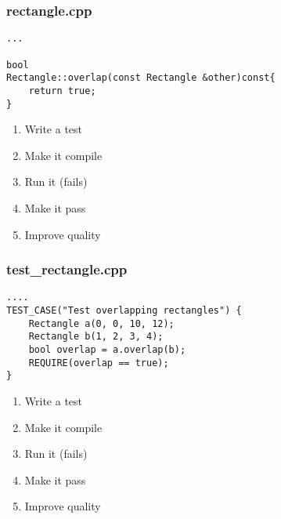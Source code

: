 \begin{frame}[fragile]
\frametitle{rectangle.cpp}
\begin{minipage}[t]{0.48\linewidth}
\begin{lstlisting}
...

bool 
Rectangle::overlap(const Rectangle &other)const{
    return true;
}
\end{lstlisting}
\end{minipage}\hfill
\begin{minipage}[t]{0.28\linewidth}
  \small
  \begin{enumerate} 
    \item \textcolor{deadcolor}{Write a test}
    \item \textcolor{deadcolor}{Make it compile}
    \item \textcolor{deadcolor}{Run it (fails)}
    \item \textcolor{deadcolor}{Make it pass}
    \item \textcolor{activecolor}{Improve quality}
  \end{enumerate} 
\end{minipage}
\end{frame}

\begin{frame}[fragile]
\frametitle{test\_rectangle.cpp}
\begin{minipage}[t]{0.48\linewidth}
\begin{lstlisting}
....
TEST_CASE("Test overlapping rectangles") {
    Rectangle a(0, 0, 10, 12);
    Rectangle b(1, 2, 3, 4);
    bool overlap = a.overlap(b);
    REQUIRE(overlap == true);
}
\end{lstlisting}
\end{minipage}\hfill
\begin{minipage}[t]{0.28\linewidth}
  \small
  \begin{enumerate} 
    \item \textcolor{deadcolor}{Write a test}
    \item \textcolor{deadcolor}{Make it compile}
    \item \textcolor{deadcolor}{Run it (fails)}
    \item \textcolor{deadcolor}{Make it pass}
    \item \textcolor{activecolor}{Improve quality}
  \end{enumerate} 
\end{minipage}
\end{frame}



